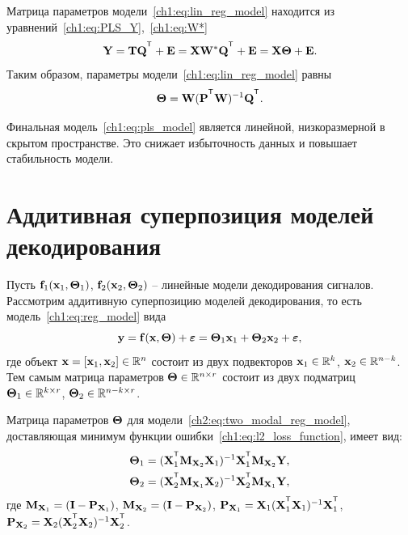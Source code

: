 Матрица параметров модели~\ref{ch1:eq:lin_reg_model} находится из уравнений~\eqref{ch1:eq:PLS_Y},~\eqref{ch1:eq:W*}
\begin{equation*}
	\bY = \bT \bQ^{\T} + \bE = \bX \bW^* \bQ^{\T} + \bE = \bX \bTheta + \bE.
	\label{ch1:eq:pls_model}
\end{equation*}
Таким образом, параметры модели~\eqref{ch1:eq:lin_reg_model} равны
\begin{equation}
	\bTheta = \bW (\bP^{\T} \bW)^{-1} \bQ^{\T}.
	\label{ch1:eq:linear_regression_model_parameters}
\end{equation}

Финальная модель~\eqref{ch1:eq:pls_model} является линейной, низкоразмерной в скрытом пространстве. 
Это снижает избыточность данных и повышает стабильность модели.

\section{Аддитивная суперпозиция моделей декодирования}
\label{sec:ch2:superposition}

Пусть $\mathbf{f}_1(\mathbf{x}_1, \boldsymbol{\Theta}_1)$, $\mathbf{f}_2(\mathbf{x}_2, \boldsymbol{\Theta}_2)$ -- линейные модели декодирования сигналов. 
Рассмотрим аддитивную суперпозицию моделей декодирования, то есть модель~\eqref{ch1:eq:reg_model} вида
\begin{equation}
	\mathbf{y} = \mathbf{f}(\mathbf{x}, \boldsymbol{\Theta}) + \boldsymbol{\varepsilon} = \boldsymbol{\Theta}_1 \mathbf{x}_1 + \boldsymbol{\Theta}_2 \mathbf{x}_2 + \boldsymbol{\varepsilon},
	\label{ch2:eq:two_modal_reg_model}
\end{equation}
где объект $\mathbf{x} = [\mathbf{x}_1, \mathbf{x}_2] \in \mathbb{R}^n$ состоит из двух подвекторов $\mathbf{x}_1 \in \mathbb{R}^k$, $\mathbf{x}_2 \in \mathbb{R}^{n - k}$. Тем самым матрица параметров $\boldsymbol{\Theta} \in \mathbb{R}^{n \times r}$ состоит из двух подматриц $\boldsymbol{\Theta}_1 \in \mathbb{R}^{k \times r}$, $\boldsymbol{\Theta}_2 \in \mathbb{R}^{n - k \times r}$. 

\begin{statement}
	\label{stat:two_modal_params}
	Матрица параметров $\boldsymbol{\Theta}$ для модели~\eqref{ch2:eq:two_modal_reg_model}, доставляющая минимум функции ошибки~\eqref{ch1:eq:l2_loss_function}, имеет вид:
	\begin{align*}
		\bTheta_1 &= (\bX_1^{\T} \bM_{\bX_2} \bX_1)^{-1} \bX_1^{\T} \bM_{\bX_2} \bY, \\
		\bTheta_2 &= (\bX_2^{\T} \bM_{\bX_1} \bX_2)^{-1} \bX_2^{\T} \bM_{\bX_1} \bY,
	\end{align*}
	где $\mathbf{M}_{\mathbf{X}_1} = (\mathbf{I} - \mathbf{P}_{\mathbf{X}_1})$, $\mathbf{M}_{\mathbf{X}_2} = (\mathbf{I} - \mathbf{P}_{\mathbf{X}_2})$, $\bP_{\bX_1} = \bX_1 (\bX_1^{\T} \bX_1)^{-1} \bX_1^{\T}$, $\bP_{\bX_2} = \bX_2 (\bX_2^{\T} \bX_2)^{-1} \bX_2^{\T}$.
\end{statement}

